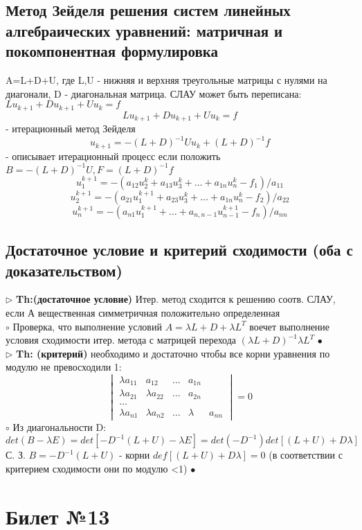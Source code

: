 \documentclass[a4paper]{article}
\begin{document}
\subsection{Метод Зейделя решения систем линейных алгебраических уравнений: матричная и покомпонентная формулировка}
A=L+D+U, где L,U - нижняя и верхняя треугольные матрицы с нулями на диагонали, D - диагональная матрица. СЛАУ может быть переписана:
$Lu_{k+1} + Du_{k+1} + Uu_k = f $
$$ Lu_{k+1} + Du_{k+1} + Uu_k =f$$ - итерационный метод Зейделя
$$ u_{k+1} = -(L+D)^{-1}Uu_k + (L+D)^{-1}f$$ - описывает итерационный процесс если положить $ B=-(L+D)^{-1}U, F=(L+D)^{-1}f$
$$ u_1^{k+1}=-(a_{12}u_2^k + a_{13}u_3^k + \ldots + a_{1n}u_n^k - f_1)/a_{11}$$
$$ u_2^{k+1}=-(a_{21}u_1^{k+1} + a_{23}u_3^k + \ldots + a_{1n}u_n^k - f_2)/a_{22}$$
$$ u_n^{k+1}=-(a_{n1}u_1^{k+1} + \ldots + a_{n,n-1}u_{n-1}^{k+1} - f_n)/a_{nn} $$
\subsection{Достаточное условие и критерий сходимости (оба с доказательством)}
$\triangleright$ \textbf{Th:(достаточное условие)} Итер. метод сходится к решению соотв. СЛАУ, если А вещественная симметричная положительно определенная \\
	$\circ$ 
		Проверка, что выполнение условий $ A = \lambda L + D + \lambda L^{T}$ воечет выполнение условия сходимости итер. метода с матрицей перехода $(\lambda L+D)^{-1}\lambda L^{T}$
	$\bullet$ \\

$\triangleright$ \textbf{Th: (критерий)} необходимо и достаточно чтобы все корни уравнения по модулю не превосходили 1:
$$ \begin{vmatrix} 
\lambda a_{11} & a_{12} & \ldots & a_{1n} \\
\lambda a_{21} & \lambda a_{22} & \ldots & a_{2n} \\
\ldots \\
\lambda a_{n1} & \lambda a_{n2} & \ldots & \lambda & a_{nn}
\end{vmatrix} = 0 $$
	$\circ$ 
		Из диагональности D:
		$$ det(B-\lambda E) = det[-D^{-1}(L+U) - \lambda E] = det(-D^{-1}) det[(L+U) + D\lambda] $$
		С. З. $B=-D^{-1}(L+U)$ - корни $def[(L+U)+D\lambda]=0$ (в соответствии с критерием сходимости они по модулю <1)
	$\bullet$

\section{Билет №13}
\end{document}
